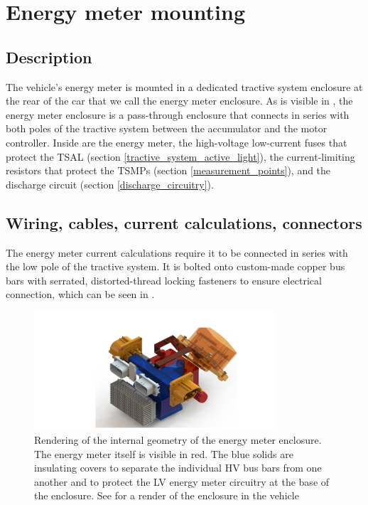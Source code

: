 \documentclass{article}
\begin{document}
\section{Energy meter mounting} \label{energy_meter_mounting}
\subsection{Description}
The vehicle's energy meter is mounted in a dedicated tractive system enclosure at the rear of the car that we call the energy meter enclosure. As is visible in , the energy meter enclosure is a pass-through enclosure that connects in series with both poles of the tractive system between the accumulator and the motor controller. Inside are the energy meter, the high-voltage low-current fuses that protect the TSAL (section \ref{tractive_system_active_light}), the current-limiting resistors that protect the TSMPs (section \ref{measurement_points}), and the discharge circuit (section \ref{discharge_circuitry}). 

\subsection{Wiring, cables, current calculations, connectors}

The energy meter current calculations require it to be connected in series with the low pole of the tractive system. It is bolted onto custom-made copper bus bars with serrated, distorted-thread locking fasteners to ensure electrical connection, which can be seen in . 

\begin{figure}[H]
\centering
\includegraphics[width=0.8\textwidth]{EnergyMeterExposedInternalsCovered}
\caption{Rendering of the internal geometry of the energy meter enclosure. The energy meter itself is visible in red. The blue solids are insulating covers to separate the individual HV bus bars from one another and to protect the LV energy meter circuitry at the base of the enclosure. See  for a render of the enclosure in the vehicle}
\label{fig:energy_meter_internals}
\end{figure}
\end{document}
